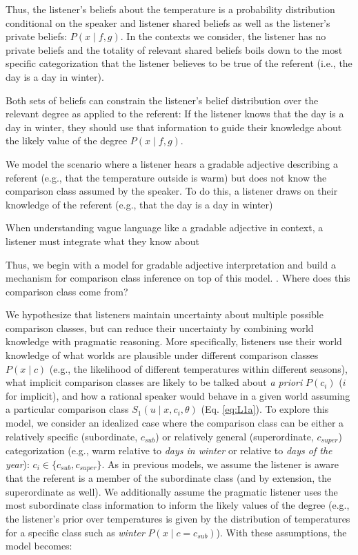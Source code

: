 \documentclass[doc]{apa6}
\begin{document}
Thus, the listener's beliefs about the temperature is a probability distribution conditional on the speaker and listener shared beliefs as well as the listener's private beliefs: $P(x \mid f, g)$.
In the contexts we consider, the listener has no private beliefs and the totality of relevant shared beliefs boils down to the most specific categorization that the listener believes to be true of the referent (i.e., the day is a day in winter).



Both sets of beliefs can constrain the listener's belief distribution over the relevant degree as applied to the referent: If the listener knows that the day is a day in winter, they should use that information to guide their knowledge about the likely value of the degree $P(x \mid f, g)$.


We model the scenario where a listener hears a gradable adjective describing a referent (e.g., that the temperature outside is warm) but does not know the comparison class assumed by the speaker. 
To do this, a listener draws on their knowledge of the referent (e.g., that the day is a day in winter)

When understanding vague language like a gradable adjective in context, a listener must integrate what they know about 

Thus, we begin with a model for gradable adjective interpretation and build a mechanism for comparison class inference on top of this model. 
. Where does this comparison class come from?

We hypothesize that listeners maintain uncertainty about multiple
possible comparison classes, but can reduce their uncertainty by
combining world knowledge with pragmatic reasoning. More specifically,
listeners use their world knowledge of what worlds are plausible under
different comparison classes \(P(x \mid c)\) (e.g., the likelihood of
different temperatures within different seasons), what implicit
comparison classes are likely to be talked about \emph{a priori}
\(P(c_i)\) (\(i\) for implicit), and how a rational speaker would behave
in a given world assuming a particular comparison class
\(S_{1}(u \mid x, c_i, \theta)\) (Eq. \ref{eq:L1a}). To explore this
model, we consider an idealized case where the comparison class can be
either a relatively specific (subordinate, \(c_{sub}\)) or relatively
general (superordinate, \(c_{super}\)) categorization (e.g., warm
relative to \emph{days in winter} or relative to \emph{days of the
year}): \(c_i \in \{c_{sub}, c_{super}\}\). As in previous models, we
assume the listener is aware that the referent is a member of the
subordinate class (and by extension, the superordinate as well). We
additionally assume the pragmatic listener uses the most subordinate
class information to inform the likely values of the degree (e.g., the
listener's prior over temperatures is given by the distribution of
temperatures for a specific class such as \emph{winter}
\(P(x \mid c = c_{sub})\)). With these assumptions, the model becomes:
\end{document}

